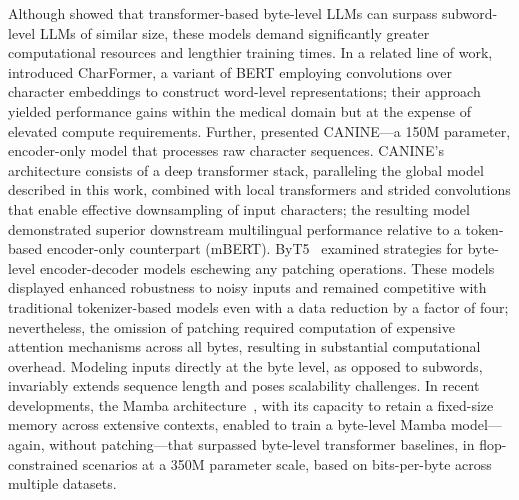 Although \cite{Choe2019BridgingTG} showed that transformer-based byte-level LLMs can surpass subword-level LLMs of similar size, these models demand significantly greater computational resources and lengthier training times. In a related line of work, \cite{el2020characterbert} introduced CharFormer, a variant of BERT employing convolutions over character embeddings to construct word-level representations; their approach yielded performance gains within the medical domain but at the expense of elevated compute requirements. Further, \cite{clark2022canine} presented CANINE—a 150M parameter, encoder-only model that processes raw character sequences. CANINE’s architecture consists of a deep transformer stack, paralleling the global model described in this work, combined with local transformers and strided convolutions that enable effective downsampling of input characters; the resulting model demonstrated superior downstream multilingual performance relative to a token-based encoder-only counterpart (mBERT). ByT5~\citep{xue2022byt5} examined strategies for byte-level encoder-decoder models eschewing any patching operations. These models displayed enhanced robustness to noisy inputs and remained competitive with traditional tokenizer-based models even with a data reduction by a factor of four; nevertheless, the omission of patching required computation of expensive attention mechanisms across all bytes, resulting in substantial computational overhead. Modeling inputs directly at the byte level, as opposed to subwords, invariably extends sequence length and poses scalability challenges. In recent developments, the Mamba architecture~\citep{gu2023mamba}, with its capacity to retain a fixed-size memory across extensive contexts, enabled \cite{wang2024mambabyte} to train a byte-level Mamba model—again, without patching—that surpassed byte-level transformer baselines, in flop-constrained scenarios at a 350M parameter scale, based on bits-per-byte across multiple datasets.

